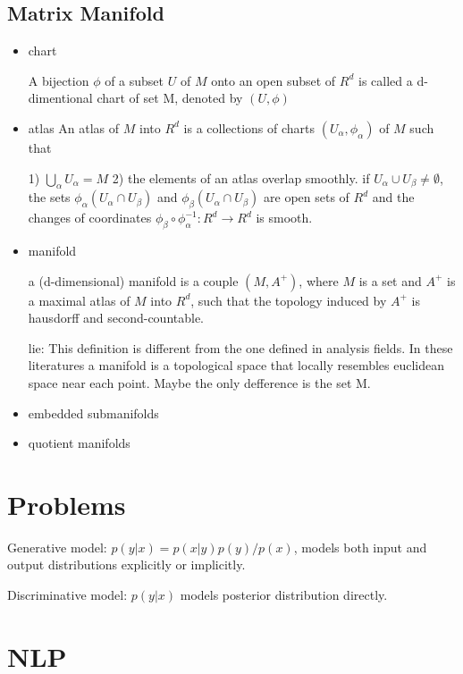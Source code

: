 \documentclass[10pt,a4paper]{book}
\begin{document}
\section {Matrix Manifold}
\begin{itemize}
	\item chart
	
	A bijection $\phi$ of a subset $U$ of $M$ onto an open subset of $R^d$ is called a d-dimentional chart of set M, denoted by  $(U, \phi)$
	
	\item {atlas}
	An atlas of $M$ into $R^d$ is a collections of charts $(U_{\alpha}, \phi_{\alpha })$ of $M$ such that 
	
	1) $\bigcup_{\alpha}U_{\alpha} = M$
	2) the elements of an atlas overlap smoothly. if $U_{\alpha} \cup U_{\beta}  \neq \emptyset$, the sets $\phi_{\alpha}(U_{\alpha} \cap U_{\beta})$ and  $\phi_{\beta}(U_{\alpha} \cap U_{\beta})$ are open sets of $R^d$ and the changes of coordinates $\phi_{\beta} \circ \phi_{\alpha}^{-1} : R^d \to R^d $ is smooth.
	
	\item {manifold}
	
	a (d-dimensional) manifold is a couple $(M, A^+)$, where $M$ is a set and $A^+$ is a maximal atlas of $M$ into $R^d$, such that the topology induced by $A^+$ is hausdorff and second-countable.
	
	lie: This definition is different from the one defined in analysis fields. In these literatures a manifold is a topological space that locally resembles euclidean space near each point. Maybe the only defference is the set M.
	
	
	\item embedded submanifolds
	\item quotient manifolds
	
	
\end{itemize}
	
\chapter{Problems}

Generative model: $p(y|x) = p(x|y)p(y)/p(x)$, models both input and output distributions explicitly or implicitly.


Discriminative model: $p(y|x)$
models posterior distribution directly.


\chapter{NLP}
\end{document}
